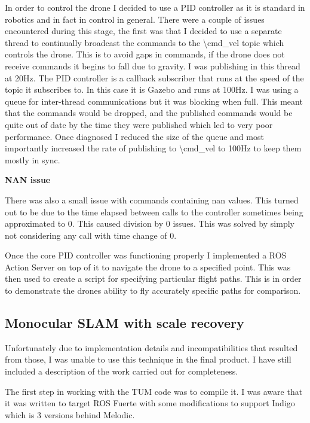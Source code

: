 \documentclass[]{../resources/final_report}
\begin{document}
In order to control the drone I decided to use a PID controller as it is standard in robotics and in fact in control in general. There were a couple of issues encountered during this stage, the first was that I decided to use a separate thread to continually broadcast the commands to the \textbackslash cmd\_vel topic which controls the drone. This is to avoid gaps in commands, if the drone does not receive commands it begins to fall due to gravity. I was publishing in this thread at 20Hz. The PID controller is a callback subscriber that runs at the speed of the topic it subscribes to. In this case it is Gazebo and runs at 100Hz. I was using a queue for inter-thread communications but it was blocking when full. This meant that the commands would be dropped, and the published commands would be quite out of date by the time they were published which led to very poor performance. Once diagnosed I reduced the size of the queue and most importantly increased the rate of publishing to \textbackslash cmd\_vel to 100Hz to keep them mostly in sync.


\textbf{NAN issue}

There was also a small issue with commands containing nan values. This turned out to be due to the time elapsed between calls to the controller sometimes being approximated to 0. This caused division by 0 issues. This was solved by simply not considering any call with time change of 0.

Once the core PID controller was functioning properly I implemented a ROS Action Server on top of it to navigate the drone to a specified point. This was then used to create a script for specifying particular flight paths. This is in order to demonstrate the drones ability to fly accurately specific paths for comparison.

\subsection{Monocular SLAM with scale recovery}

Unfortunately due to implementation details and incompatibilities that resulted from those, I was unable to use this technique in the final product. I have still included a description of the work carried out for completeness.

The first step in working with the TUM code was to compile it. I was aware that it was written to target ROS Fuerte with some modifications to support Indigo which is 3 versions behind Melodic.
\end{document}
